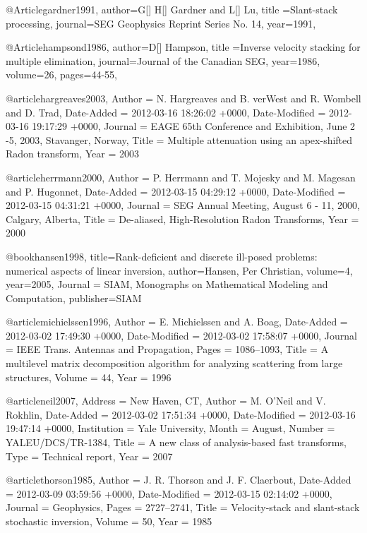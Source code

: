 

@Article{gardner1991,
  author={G[] H[] Gardner and L[] Lu},
  title ={Slant-stack processing},
  journal={SEG Geophysics Reprint Series No. 14},
  year=1991,
}

@Article{hampsond1986,
  author={D[] Hampson},
  title ={Inverse velocity stacking for multiple elimination},
  journal={Journal of the Canadian SEG},
  year=1986,
  volume=26,
  pages={44-55},
}

@article{hargreaves2003,
	Author = {N. Hargreaves and B. verWest and R. Wombell and D. Trad},
	Date-Added = {2012-03-16 18:26:02 +0000},
	Date-Modified = {2012-03-16 19:17:29 +0000},
	Journal = {EAGE 65th Conference and Exhibition, June 2 -5, 2003, Stavanger, Norway},
	Title = {Multiple attenuation using an apex-shifted {R}adon transform},
	Year = {2003}}

@article{herrmann2000,
	Author = {P. Herrmann and T. Mojesky and M. Magesan and P. Hugonnet},
	Date-Added = {2012-03-15 04:29:12 +0000},
	Date-Modified = {2012-03-15 04:31:21 +0000},
	Journal = {SEG Annual Meeting, August 6 - 11, 2000, Calgary, Alberta},
	Title = {De-aliased, High-Resolution {R}adon Transforms},
	Year = {2000}}

@book{hansen1998,
  title={Rank-deficient and discrete ill-posed problems: numerical aspects of linear inversion},
  author={Hansen, Per Christian},
  volume={4},
  year={2005},
  Journal = {SIAM, Monographs on Mathematical Modeling and Computation},
  publisher={SIAM}
}


@article{michielssen1996,
	Author = {E. Michielssen and A. Boag},
	Date-Added = {2012-03-02 17:49:30 +0000},
	Date-Modified = {2012-03-02 17:58:07 +0000},
	Journal = {IEEE Trans. Antennas and Propagation},
	Pages = {1086--1093},
	Title = {A multilevel matrix decomposition algorithm for analyzing scattering from large structures},
	Volume = {44},
	Year = {1996}}

@article{neil2007,
	Address = {New Haven, CT},
	Author = {M. O'Neil and V. Rokhlin},
	Date-Added = {2012-03-02 17:51:34 +0000},
	Date-Modified = {2012-03-16 19:47:14 +0000},
	Institution = {Yale University},
	Month = {August},
	Number = {YALEU/DCS/TR-1384},
	Title = {A new class of analysis-based fast transforms},
	Type = {Technical report},
	Year = {2007}}

@article{thorson1985,
	Author = {J. R. Thorson and J. F. Claerbout},
	Date-Added = {2012-03-09 03:59:56 +0000},
	Date-Modified = {2012-03-15 02:14:02 +0000},
	Journal = {Geophysics},
	Pages = {2727--2741},
	Title = {Velocity-stack and slant-stack stochastic inversion},
	Volume = {50},
	Year = {1985}}

